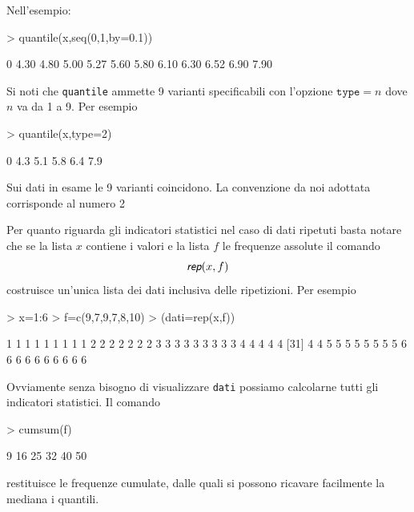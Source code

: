 \documentclass[onecolumn,12pt]{book}
\newcommand{\varia}[1]{\textsl{\textsf{#1}}}
\begin{document}
\begin{itemize}
Nell'esempio:
\begin{Schunk}
\begin{Sinput}
> quantile(x,seq(0,1,by=0.1))
\end{Sinput}
\begin{Soutput}
  0%
4.30 4.80 5.00 5.27 5.60 5.80 6.10 6.30 6.52 6.90 7.90 
\end{Soutput}
\end{Schunk}
Si noti che \texttt{quantile} ammette 9 varianti specificabili con l'opzione $\texttt{type}=n$ dove $n$ va da 1 a 9.
Per esempio
\begin{Schunk}
\begin{Sinput}
> quantile(x,type=2)
\end{Sinput}
\begin{Soutput}
  0%
 4.3  5.1  5.8  6.4  7.9 
\end{Soutput}
\end{Schunk}
Sui dati in esame le 9 varianti coincidono. La convenzione da noi adottata corrisponde al numero 2
\end{itemize}
Per quanto riguarda gli indicatori statistici nel caso di dati ripetuti basta notare che se la lista $x$ contiene i valori e la lista $f$ le frequenze assolute il comando
$$\varia{rep}(x,f)$$ costruisce un'unica lista dei dati inclusiva delle ripetizioni.
Per esempio

\begin{Schunk}
\begin{Sinput}
> x=1:6
> f=c(9,7,9,7,8,10)
> (dati=rep(x,f))
\end{Sinput}
\begin{Soutput}
 [1] 1 1 1 1 1 1 1 1 1 2 2 2 2 2 2 2 3 3 3 3 3 3 3 3 3 4 4 4 4 4
[31] 4 4 5 5 5 5 5 5 5 5 6 6 6 6 6 6 6 6 6 6
\end{Soutput}
\end{Schunk}
Ovviamente senza bisogno di visualizzare \texttt{dati} possiamo calcolarne tutti gli indicatori statistici.
Il comando
\begin{Schunk}
\begin{Sinput}
> cumsum(f)
\end{Sinput}
\begin{Soutput}
[1]  9 16 25 32 40 50
\end{Soutput}
\end{Schunk}
restituisce le frequenze cumulate, dalle quali si possono ricavare facilmente la mediana
i quantili.
\end{document}
